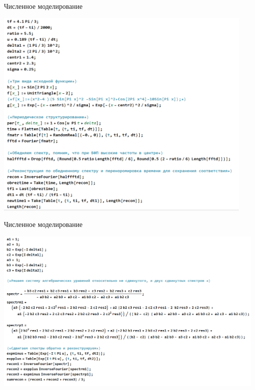 \documentclass[9pt, compress, xcolor=table]{beamer}
\begin{document}
\begin{frame}{Численное моделирование}
    \begin{center}
\includegraphics[width=0.95\textwidth]{prog1}
\end{center}
\end{frame}


\begin{frame}{Численное моделирование}
    \begin{center}
\includegraphics[width=\textwidth]{prog2}
\end{center}
\end{frame}
\end{document}
